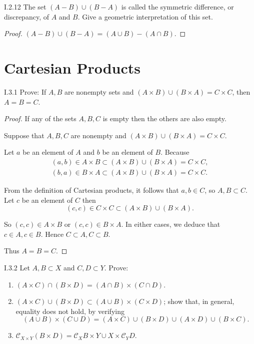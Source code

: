 \begin{problem}{I.2.12}
The set \( (A - B) \cup (B - A) \) is called the symmetric difference, or discrepancy, of \( A \) and \( B \). Give a geometric interpretation of this set.
\end{problem}

\begin{proof}
	\( (A - B) \cup (B - A) = (A \cup B) - (A \cap B) \).
\end{proof}

\section{Cartesian Products}

\begin{problem}{I.3.1}
Prove: If \( A, B \) are nonempty sets and \( (A\times B) \cup (B\times A) = C\times C \), then \( A = B = C \).
\end{problem}

\begin{proof}
	If any of the sets \( A, B, C \) is empty then the others are also empty.

	Suppose that \( A, B, C \) are nonempty and \( (A\times B) \cup (B\times A) = C\times C \).

	Let \( a \) be an element of \( A \) and \( b \) be an element of \( B \). Because
	\[
		\begin{split}
			(a, b) \in A \times B \subset (A \times B) \cup (B \times A) = C \times C, \\
			(b, a) \in B \times A \subset (A \times B) \cup (B \times A) = C \times C.
		\end{split}
	\]

	From the definition of Cartesian products, it follows that \( a, b \in C \), so \( A, B \subset C \). Let \( c \) be an element of \( C \) then
	\[
		(c, c) \in C\times C \subset (A\times B) \cup (B\times A).
	\]

	So \( (c, c) \in A\times B \) or \( (c, c) \in B\times A \). In either cases, we deduce that \( c \in A, c\in B \). Hence \( C \subset A, C \subset B \).

	Thus \( A = B = C \).
\end{proof}

\begin{problem}{I.3.2}
Let \( A, B \subset X \) and \( C, D \subset Y \). Prove:
\begin{enumerate}[label={(\alph*)},leftmargin=*]
	\item \( (A\times C) \cap (B\times D) = (A \cap B) \times (C \cap D) \).
	\item \( (A\times C) \cup (B\times D) \subset (A \cup B) \times (C \times D) \); show that, in general, equality does not hold, by verifying
	      \[
		      (A \cup B) \times (C \cup D) = (A \times C) \cup (B \times D) \cup (A \times D) \cup (B \times C).
	      \]
	\item \( \mathscr{C}_{X\times Y}(B\times D) = \mathscr{C}_{X}B \times Y \cup X \times \mathscr{C}_{Y}D \).
\end{enumerate}
\end{problem}

